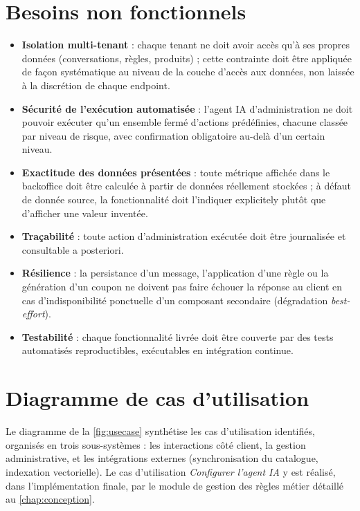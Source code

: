\section{Besoins non fonctionnels}

\begin{itemize}
    \item \textbf{Isolation multi-tenant} : chaque tenant ne doit avoir accès qu'à ses propres données (conversations, règles, produits) ; cette contrainte doit être appliquée de façon systématique au niveau de la couche d'accès aux données, non laissée à la discrétion de chaque endpoint.
    \item \textbf{Sécurité de l'exécution automatisée} : l'agent IA d'administration ne doit pouvoir exécuter qu'un ensemble fermé d'actions prédéfinies, chacune classée par niveau de risque, avec confirmation obligatoire au-delà d'un certain niveau.
    \item \textbf{Exactitude des données présentées} : toute métrique affichée dans le backoffice doit être calculée à partir de données réellement stockées ; à défaut de donnée source, la fonctionnalité doit l'indiquer explicitely plutôt que d'afficher une valeur inventée.
    \item \textbf{Traçabilité} : toute action d'administration exécutée doit être journalisée et consultable a posteriori.
    \item \textbf{Résilience} : la persistance d'un message, l'application d'une règle ou la génération d'un coupon ne doivent pas faire échouer la réponse au client en cas d'indisponibilité ponctuelle d'un composant secondaire (dégradation \emph{best-effort}).
    \item \textbf{Testabilité} : chaque fonctionnalité livrée doit être couverte par des tests automatisés reproductibles, exécutables en intégration continue.
\end{itemize}

\section{Diagramme de cas d'utilisation}

Le diagramme de la \cref{fig:usecase} synthétise les cas d'utilisation identifiés, organisés en trois sous-systèmes : les interactions côté client, la gestion administrative, et les intégrations externes (synchronisation du catalogue, indexation vectorielle). Le cas d'utilisation \emph{Configurer l'agent IA} y est réalisé, dans l'implémentation finale, par le module de gestion des règles métier détaillé au \cref{chap:conception}.

